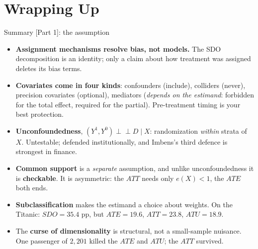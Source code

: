 \documentclass[
  11pt,
  ignorenonframetext,
  aspectratio=169,
]{beamer}
\providecommand{\tightlist}{%
  \setlength{\itemsep}{0pt}\setlength{\parskip}{0pt}}
\newcommand{\indep}{\perp\!\!\!\perp}
\begin{document}
\section{Wrapping Up}\label{wrapping-up}

\begin{frame}{Summary {[}Part 1{]}: the assumption}
\protect{}\label{summary-part-1-the-assumption}
\begin{itemize}
\tightlist
\item
  \textbf{Assignment mechanisms resolve bias, not models.} The SDO
  decomposition is an identity; only a claim about how treatment was
  assigned deletes its bias terms.
\item
  \textbf{Covariates come in four kinds}: confounders (include),
  colliders (never), precision covariates (optional), mediators
  (\emph{depends on the estimand}: forbidden for the total effect,
  required for the partial). Pre-treatment timing is your best
  protection.
\item
  \textbf{Unconfoundedness}, \((Y^1,Y^0) \indep D \mid X\):
  randomization \emph{within} strata of \(X\). Untestable; defended
  institutionally, and Imbens's third defence is strongest in finance.
\item
  \textbf{Common support} is a \emph{separate} assumption, and unlike
  unconfoundedness it is \textbf{checkable}. It is asymmetric: the
  \(ATT\) needs only \(e(X) < 1\), the \(ATE\) both ends.
\item
  \textbf{Subclassification} makes the estimand a choice about weights.
  On the Titanic: \(SDO = 35.4\) pp, but \(ATE = 19.6\), \(ATT = 23.8\),
  \(ATU = 18.9\).
\item
  The \textbf{curse of dimensionality} is structural, not a small-sample
  nuisance. One passenger of \(2{,}201\) killed the \(ATE\) and \(ATU\);
  the \(ATT\) survived.
\end{itemize}
\end{frame}
\end{document}
